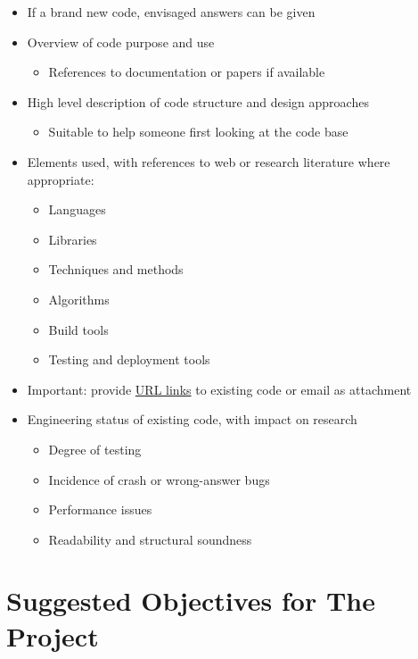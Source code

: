 \documentclass[]{scrartcl}
\begin{document}
\begin{itemize}
\itemsep1pt\parskip0pt
\item
  If a brand new code, envisaged answers can be given
\item
  Overview of code purpose and use

  \begin{itemize}
  \itemsep1pt\parskip0pt
  \item
    References to documentation or papers if available
  \end{itemize}
\item
  High level description of code structure and design approaches

  \begin{itemize}
  \itemsep1pt\parskip0pt
  \item
    Suitable to help someone first looking at the code base
  \end{itemize}
\item
  Elements used, with references to web or research literature where
  appropriate:

  \begin{itemize}
  \itemsep1pt\parskip0pt
  \item
    Languages
  \item
    Libraries
  \item
    Techniques and methods
  \item
    Algorithms
  \item
    Build tools
  \item
    Testing and deployment tools
  \end{itemize}
\item
  Important: provide \href{http://github.com/}{URL links} to existing
  code or email as attachment
\item
  Engineering status of existing code, with impact on research

  \begin{itemize}
  \itemsep1pt\parskip0pt
  \item
    Degree of testing
  \item
    Incidence of crash or wrong-answer bugs
  \item
    Performance issues
  \item
    Readability and structural soundness
  \end{itemize}
\end{itemize}

\section{Suggested Objectives for The
Project}\label{suggested-objectives-for-the-project}
\end{document}

